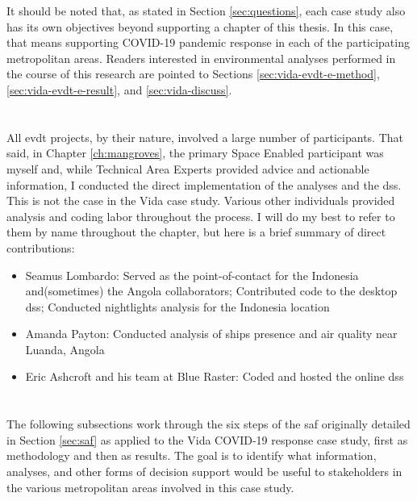 It should be noted that, as stated in Section \ref{sec:questions}, each case study also has its own objectives beyond supporting a chapter of this thesis. In this case, that means supporting COVID-19 pandemic response in each of the participating metropolitan areas. Readers interested in environmental analyses performed in the course of this research are pointed to Sections \ref{sec:vida-evdt-e-method}, \ref{sec:vida-evdt-e-result}, and \ref{sec:vida-discuss}.

\section{}

All \ac{evdt} projects, by their nature, involved a large number of participants. That said, in Chapter \ref{ch:mangroves}, the primary Space Enabled participant was myself and, while Technical Area Experts provided advice and actionable information, I conducted the direct implementation of the analyses and the \ac{dss}. This is not the case in the Vida case study. Various other individuals provided analysis and coding labor throughout the process. I will do my best to refer to them by name throughout the chapter, but here is a brief summary of direct contributions:

\begin{itemize}[itemsep=0pt,parsep=0pt]
	\item{Seamus Lombardo: Served as the point-of-contact for the Indonesia and(sometimes) the Angola collaborators; Contributed code to the desktop \ac{dss}; Conducted nightlights analysis for the Indonesia location}
	\item{Amanda Payton: Conducted analysis of ships presence and air quality near Luanda, Angola}
	\item{Eric Ashcroft and his team at Blue Raster: Coded and hosted the online \ac{dss}}
\end{itemize}


\section{} \label{sec:vida-saf}

The following subsections work through the six steps of the \ac{saf} originally detailed in Section \ref{sec:saf} as applied to the Vida COVID-19 response case study, first as methodology and then as results. The goal is to identify what information, analyses, and other forms of decision support would be useful to stakeholders in the various metropolitan areas involved in this case study.

